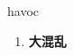 
\begin{frame}
{\huge havoc}
\begin{center}
\begin{enumerate}\Large
  \item \textbf{大混乱}
\end{enumerate}
\end{center}
\end{frame}
